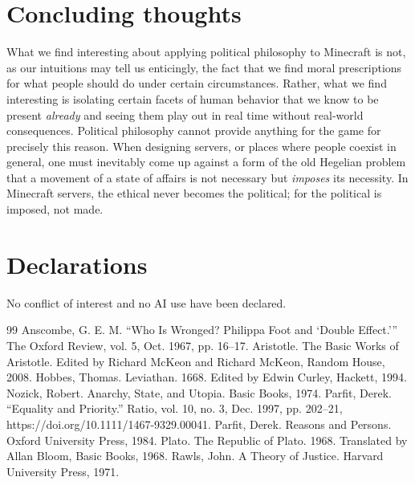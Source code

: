 \section{Concluding thoughts}
What we find interesting about applying political philosophy to Minecraft is not, as our intuitions may tell us enticingly, the fact that we find moral prescriptions for what people should do under certain circumstances. Rather, what we find interesting is isolating certain facets of human behavior that we know to be present \emph{already} and seeing them play out in real time without real-world consequences. Political philosophy cannot provide anything for the game for precisely this reason. When designing servers, or places where people coexist in general, one must inevitably come up against a form of the old Hegelian problem that a movement of a state of affairs is not necessary but \emph{imposes} its necessity. In Minecraft servers, the ethical never becomes the political; for the political is imposed, not made.

\section{Declarations}
No conflict of interest and no AI use have been declared.

    {
        \raggedright
        \begin{thebibliography}{99}
            Anscombe, G. E. M. “Who Is Wronged? Philippa Foot and ‘Double Effect.’” The Oxford Review, vol. 5, Oct. 1967, pp. 16–17.
            Aristotle. The Basic Works of Aristotle. Edited by Richard McKeon and Richard McKeon, Random House, 2008.
            Hobbes, Thomas. Leviathan. 1668. Edited by Edwin Curley, Hackett, 1994.
            Nozick, Robert. Anarchy, State, and Utopia. Basic Books, 1974.
            Parfit, Derek. “Equality and Priority.” Ratio, vol. 10, no. 3, Dec. 1997, pp. 202–21, https://doi.org/10.1111/1467-9329.00041.
            Parfit, Derek. Reasons and Persons. Oxford University Press, 1984.
            Plato. The Republic of Plato. 1968. Translated by Allan Bloom, Basic Books, 1968.
            Rawls, John. A Theory of Justice. Harvard University Press, 1971.

        \end{thebibliography}
    }
